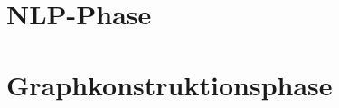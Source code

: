 \section{NLP-Phase}%
\label{sec:text2kg:nlp}

\section{Graphkonstruktionsphase}%
\label{sec:text2kg:psl}
